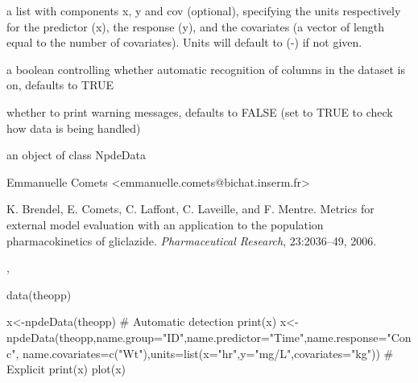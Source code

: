 \documentclass[a4paper]{book}
\begin{document}
\begin{Arguments}
\begin{ldescription}
\item[\code{units}] a list with components x, y and cov (optional), specifying the
units respectively for the predictor (x), the response (y), and the covariates 
(a vector of length equal to the number of covariates). Units will default to (-) if not given.

\item[\code{detect}] a boolean controlling whether automatic recognition of columns in the dataset is on, defaults to TRUE

\item[\code{verbose}] whether to print warning messages, defaults to FALSE (set to TRUE to check how data is being handled)
\end{ldescription}
\end{Arguments}
%
\begin{Value}
an object of class NpdeData
\end{Value}
%
\begin{Author}\relax
Emmanuelle Comets <emmanuelle.comets@bichat.inserm.fr>
\end{Author}
%
\begin{References}\relax
K. Brendel, E. Comets, C. Laffont, C. Laveille, and F.
Mentre. Metrics for external model evaluation with an application to the
population pharmacokinetics of gliclazide. \emph{Pharmaceutical Research},
23:2036--49, 2006.
\end{References}
%
\begin{SeeAlso}\relax
{}, 
\end{SeeAlso}
%
\begin{Examples}
\begin{ExampleCode}

data(theopp)

x<-npdeData(theopp) # Automatic detection
print(x)
x<-npdeData(theopp,name.group="ID",name.predictor="Time",name.response="Conc", 
name.covariates=c("Wt"),units=list(x="hr",y="mg/L",covariates="kg")) # Explicit
print(x)
plot(x)
\end{ExampleCode}
\end{Examples}
\end{document}
